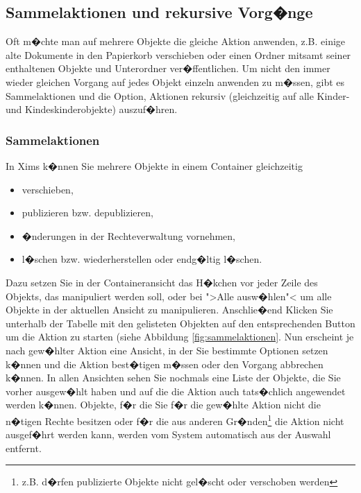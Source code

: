 \subsection{Sammelaktionen und rekursive Vorg�nge}
Oft m�chte man auf mehrere Objekte die gleiche Aktion anwenden, z.B. einige alte Dokumente in den Papierkorb verschieben oder einen Ordner mitsamt seiner enthaltenen Objekte und Unterordner ver�ffentlichen. Um nicht den immer wieder gleichen Vorgang auf jedes Objekt einzeln anwenden zu m�ssen, gibt es Sammelaktionen und die Option, Aktionen rekursiv (gleichzeitig auf alle Kinder- und Kindeskinderobjekte) auszuf�hren.

\subsubsection{Sammelaktionen}
In Xims k�nnen Sie mehrere Objekte in einem Container gleichzeitig
\begin{itemize}
	\item verschieben,
	\item publizieren bzw. depublizieren,
	\item �nderungen in der Rechteverwaltung vornehmen,
	\item l�schen bzw. wiederherstellen oder endg�ltig l�schen.
\end{itemize}
Dazu setzen Sie in der Containeransicht das H�kchen vor jeder Zeile des Objekts, das manipuliert werden soll, oder bei ">Alle ausw�hlen"< um alle Objekte in der aktuellen Ansicht zu manipulieren. Anschlie�end Klicken Sie unterhalb der Tabelle mit den gelisteten Objekten auf den entsprechenden Button um die Aktion zu starten (siehe Abbildung \ref{fig:sammelaktionen}.
Nun erscheint je nach gew�hlter Aktion eine Ansicht, in der Sie bestimmte Optionen setzen k�nnen und die Aktion best�tigen m�ssen oder den Vorgang abbrechen k�nnen.
In allen Ansichten sehen Sie nochmals eine Liste der Objekte, die Sie vorher ausgew�hlt haben und auf die die Aktion auch tats�chlich angewendet werden k�nnen. Objekte, f�r die Sie f�r die gew�hlte Aktion nicht die n�tigen Rechte besitzen oder f�r die aus anderen Gr�nden\footnote{z.B. d�rfen publizierte Objekte nicht gel�scht oder verschoben werden} die Aktion nicht ausgef�hrt werden kann, werden vom System automatisch aus der Auswahl entfernt.

